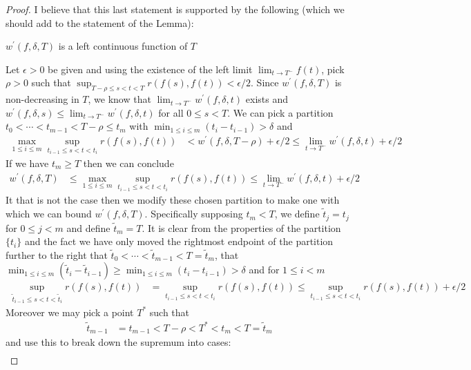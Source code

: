\begin{proof}
I believe that this last statement is supported by the following (which we should add to the statement of the Lemma):
\begin{clm}$w^\prime(f,\delta, T)$ is a left continuous function of $T$
\end{clm}
Let $\epsilon > 0$ be given and using the existence of the left limit $\lim_{t \to T^-} f(t)$, pick $\rho > 0$ such that $\sup_{T - \rho \leq s < t < T} r(f(s), f(t)) < \epsilon/2$.  Since 
$w^\prime(f,\delta, T)$ is non-decreasing in $T$, we know that $\lim_{t \to T^-} w^\prime(f,\delta, t)$ exists and $w^\prime(f,\delta, s) \leq \lim_{t \to T^-} w^\prime(f,\delta, t)$ for all $0 \leq s < T$.  We can pick a partition $t_0 < \dotsb < t_{m -1} < T - \rho \leq t_{m}$ with $\min_{1 \leq i \leq m} (t_i - t_{i-1}) > \delta$ and 
\begin{align*}
\max_{1 \leq i \leq m} \sup_{t_{i-1} \leq s < t < t_i} r(f(s),f(t)) &< w^\prime(f,\delta, T-\rho) + \epsilon/2 \leq \lim_{t \to T^-} w^\prime(f,\delta, t) + \epsilon/2
\end{align*}
If we have $t_{m} \geq T$ then we can conclude 
\begin{align*}
w^\prime(f,\delta,T) &\leq \max_{1 \leq i \leq m} \sup_{t_{i-1} \leq s < t < t_i} r(f(s),f(t)) \leq \lim_{t \to T^-} w^\prime(f,\delta, t) + \epsilon/2
\end{align*}  
It that is not the case then
we modify these chosen partition to make one with which we can bound $w^\prime(f,\delta,T)$.  Specifically supposing $t_{m} < T$, we define $\tilde{t}_j = t_j$ for $0 \leq j < m$ and define $\tilde{t}_{m} = T$.  It is clear from the properties of the partition $\lbrace t_i \rbrace$ and the fact we have only moved the rightmost endpoint of the partition further to the right that $\tilde{t}_0 < \dotsb < \tilde{t}_{m -1} < T = \tilde{t}_{m}$, that
$\min_{1 \leq i \leq m} (\tilde{t}_i - \tilde{t}_{i-1}) \geq \min_{1 \leq i \leq m} (t_i - t_{i-1}) > \delta$ and for $1 \leq i < m$
\begin{align*}
\sup_{\tilde{t}_{i-1} \leq s < t < \tilde{t}_i} r(f(s),f(t))  &= \sup_{t_{i-1} \leq s < t < t_i} r(f(s),f(t))  \leq \sup_{t_{i-1} \leq s < t < t_i} r(f(s),f(t)) + \epsilon/2
\end{align*}
Moreover we may pick a point $T^*$ such that  
\begin{align*}
\tilde{t}_{m-1} &= t_{m-1} < T - \rho < T^*  < t_{m} < T = \tilde{t}_m
\end{align*} 
and use this to break down the supremum into cases:
\begin{align*}

\end{align*}
\end{proof}
